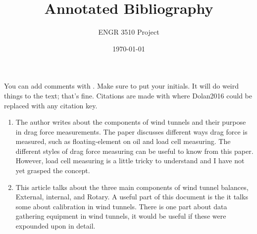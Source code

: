 \documentclass[12pt,letterpaper]{article}
\begin{document}
\title{Annotated Bibliography}
\author{ENGR 3510 Project}
\date{\today}
\maketitle

You can add comments with . Make sure to put your initials. It will do weird things to the text; that's fine. 
Citations are made with \cite{Dolan2016} where Dolan2016 could be replaced with any citation key. 


\begin{enumerate}
	\item \cite{Nan2013} The author writes about the components of wind tunnels and their purpose in drag force measurements. The paper discusses different ways drag force is measured, such as floating-element on oil and load cell measuring. The different styles of drag force measuring can be useful to know from this paper. However, load cell measuring is a little tricky to understand and I have not yet grasped the concept. 
	
	
	\item \cite{Gonzalez} This article talks about the three main components of wind tunnel balances, External, internal, and Rotary. A useful part of this document is the it talks some about calibration in wind tunnels. There is one part about data gathering equipment in wind tunnels, it would be useful if these were expounded upon in detail.  
\end{enumerate}

\printbibliography
\end{document}
